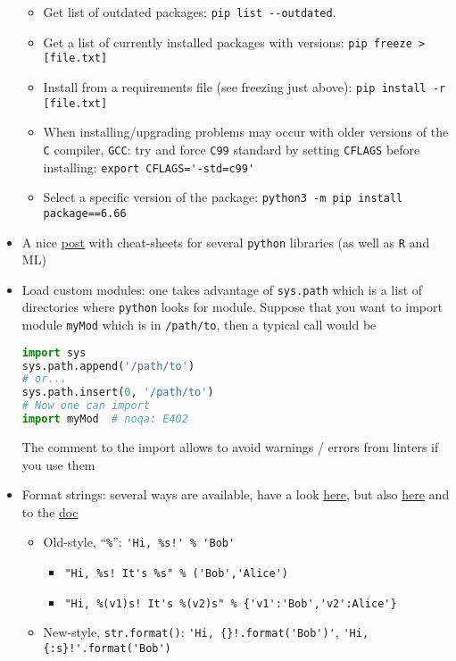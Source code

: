 \documentclass[a4paper,12pt,%
              final%
              ]{article}
\begin{document}
\begin{itemize}
\begin{itemize}
      \item Get list of outdated packages: \verb|pip list --outdated|.
      \item Get a list of currently installed packages with versions: \verb|pip freeze > [file.txt]|
      \item Install from a requirements file (see freezing just above): \verb|pip install -r [file.txt]|
      \item When installing/upgrading problems may occur with older versions of the \texttt{C} compiler, \texttt{GCC}: try and force \texttt{C99} standard by setting \texttt{CFLAGS} before installing: \verb|export CFLAGS='-std=c99'|
      \item Select a specific version of the package: \verb|python3 -m pip install package==6.66|
    \end{itemize}
  \item A nice \href{https://medium.com/@anushkhabajpai/top-data-science-cheat-sheets-ml-dl-python-r-sql-maths-statistics-5239d4568225}{post} with cheat-sheets for several \texttt{python} libraries (as well as \texttt{R} and ML)
  \item Load custom modules: one takes advantage of \verb|sys.path| which is a list of directories where \texttt{python} looks for module. Suppose that you want to import module \texttt{myMod} which is in \texttt{/path/to}, then a typical call would be
\begin{lstlisting}[language=python]
import sys
sys.path.append('/path/to')
# or...
sys.path.insert(0, '/path/to')
# Now one can import
import myMod  # noqa: E402
\end{lstlisting}
    The comment to the import allows to avoid warnings / errors from linters if you use them
  \item Format strings: several ways are available, have a look \href{https://realpython.com/python-string-formatting/}{here}, but also \href{https://pyformat.info/}{here} and to the \href{https://docs.python.org/3.10/library/string.html#format-string-syntax}{doc}
    \begin{itemize}
      \item Old-style, ``\verb|%|'': \verb|'Hi, %s!' % 'Bob'|
        \begin{itemize}
          \item \verb|"Hi, %s! It's %s" % ('Bob','Alice')|
          \item \verb|"Hi, %(v1)s! It's %(v2)s" % {'v1':'Bob','v2':Alice'}|
        \end{itemize}
      \item New-style, \verb|str.format()|: \verb|'Hi, {}!.format('Bob')'|, \verb|'Hi, {:s}!'.format('Bob')|

\end{itemize}
\end{itemize}
\end{document}
